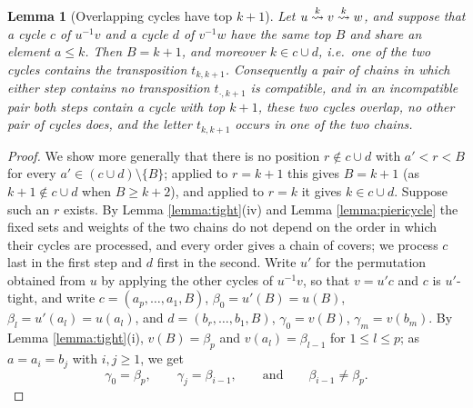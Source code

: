 \documentclass{amsart}
\newtheorem{lemma}{Lemma}[section]
\theoremstyle{definition}
\theoremstyle{remark}
\numberwithin{equation}{section}
\newcommand{\xrightsquigarrow}[2][]{%
	\mathrel{\mathop{\rightsquigarrow}\limits^{\scriptstyle #2}%
	\ifx\hfuzz#1\hfuzz\else_{\scriptstyle #1}\fi}%
}
\newcommand{\tom}[1]{\ensuremath{\xrightsquigarrow{#1}}}
\begin{document}
\begin{lemma}[Overlapping cycles have top $k+1$] \label{lemma:overlap}
Let $u\tom{k}v\tom{k}w$, and suppose that a cycle $c$ of $u^{-1}v$ and a cycle $d$ of $v^{-1}w$ have the same top $B$ and share an element $a\leq k$. Then $B=k+1$, and moreover $k\in c\cup d$, i.e.\ one of the two cycles contains the transposition $t_{k,k+1}$. Consequently a pair of chains in which either step contains no transposition $t_{\cdot,k+1}$ is compatible, and in an incompatible pair both steps contain a cycle with top $k+1$, these two cycles overlap, no other pair of cycles does, and the letter $t_{k,k+1}$ occurs in one of the two chains.
\end{lemma}
\begin{proof}
We show more generally that there is no position $r\notin c\cup d$ with $a'<r<B$ for every $a'\in(c\cup d)\setminus\{B\}$; applied to $r=k+1$ this gives $B=k+1$ (as $k+1\notin c\cup d$ when $B\geq k+2$), and applied to $r=k$ it gives $k\in c\cup d$. Suppose such an $r$ exists. By Lemma \ref{lemma:tight}(iv) and Lemma \ref{lemma:piericycle} the fixed sets and weights of the two chains do not depend on the order in which their cycles are processed, and every order gives a chain of covers; we process $c$ last in the first step and $d$ first in the second. Write $u'$ for the permutation obtained from $u$ by applying the other cycles of $u^{-1}v$, so that $v=u'c$ and $c$ is $u'$-tight, and write $c=(a_p,\ldots,a_1,B)$, $\beta_0=u'(B)=u(B)$, $\beta_l=u'(a_l)=u(a_l)$, and $d=(b_r,\ldots,b_1,B)$, $\gamma_0=v(B)$, $\gamma_m=v(b_m)$. By Lemma \ref{lemma:tight}(i), $v(B)=\beta_p$ and $v(a_l)=\beta_{l-1}$ for $1\leq l\leq p$; as $a=a_i=b_j$ with $i,j\geq1$, we get
$$\gamma_0=\beta_p,\qquad \gamma_j=\beta_{i-1},\qquad\text{and}\qquad \beta_{i-1}\neq\beta_p.$$

\end{proof}
\end{document}
